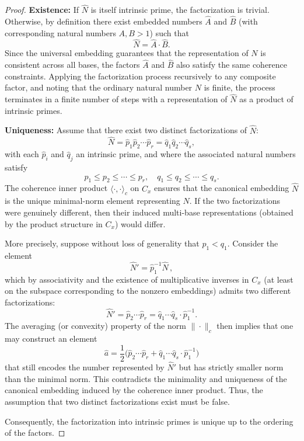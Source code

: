 \documentclass{article}
\begin{document}
\begin{proof}
\textbf{Existence:}  
If \(\widehat{N}\) is itself intrinsic prime, the factorization is trivial. Otherwise, by definition there exist embedded numbers \(\widehat{A}\) and \(\widehat{B}\) (with corresponding natural numbers \(A, B > 1\)) such that
\[
  \widehat{N} = \widehat{A}\cdot\widehat{B}.
\]
Since the universal embedding guarantees that the representation of \(N\) is consistent across all bases, the factors \(\widehat{A}\) and \(\widehat{B}\) also satisfy the same coherence constraints. Applying the factorization process recursively to any composite factor, and noting that the ordinary natural number \(N\) is finite, the process terminates in a finite number of steps with a representation of \(\widehat{N}\) as a product of intrinsic primes.

\medskip

\textbf{Uniqueness:}  
Assume that there exist two distinct factorizations of \(\widehat{N}\):
\[
  \widehat{N} = \widehat{p}_1\widehat{p}_2\cdots\widehat{p}_r = \widehat{q}_1\widehat{q}_2\cdots\widehat{q}_s,
\]
with each \(\widehat{p}_i\) and \(\widehat{q}_j\) an intrinsic prime, and where the associated natural numbers satisfy
\[
  p_1 \le p_2 \le \cdots \le p_r, \quad q_1 \le q_2 \le \cdots \le q_s.
\]
The coherence inner product \(\langle\cdot,\cdot\rangle_c\) on \(C_x\) ensures that the canonical embedding \(\widehat{N}\) is the unique minimal-norm element representing \(N\). If the two factorizations were genuinely different, then their induced multi-base representations (obtained by the product structure in \(C_x\)) would differ. 

More precisely, suppose without loss of generality that \(p_1 < q_1\). Consider the element
\[
  \widehat{N}' = \widehat{p}_1^{-1}\widehat{N} \,,
\]
which by associativity and the existence of multiplicative inverses in \(C_x\) (at least on the subspace corresponding to the nonzero embeddings) admits two different factorizations:
\[
  \widehat{N}' = \widehat{p}_2\cdots\widehat{p}_r = \widehat{q}_1\cdots\widehat{q}_s \cdot \widehat{p}_1^{-1}.
\]
The averaging (or convexity) property of the norm \(\|\cdot\|_c\) then implies that one may construct an element
\[
  \widehat{a} = \frac{1}{2}\Big(\widehat{p}_2\cdots\widehat{p}_r + \widehat{q}_1\cdots\widehat{q}_s \cdot \widehat{p}_1^{-1}\Big)
\]
that still encodes the number represented by \(\widehat{N}'\) but has strictly smaller norm than the minimal norm. This contradicts the minimality and uniqueness of the canonical embedding induced by the coherence inner product. Thus, the assumption that two distinct factorizations exist must be false.

Consequently, the factorization into intrinsic primes is unique up to the ordering of the factors.
\end{proof}
\end{document}
